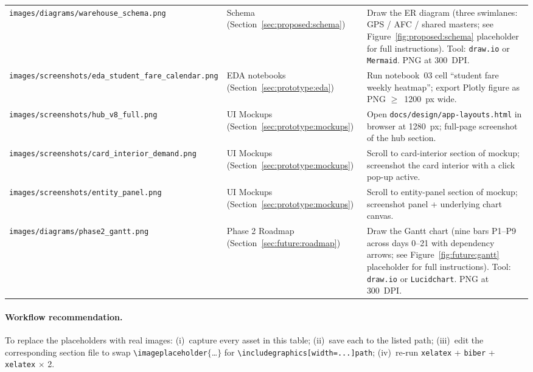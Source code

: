 \begin{longtable}{p{3.4cm}p{4.6cm}p{6.5cm}}
\texttt{images/diagrams/\linebreak warehouse\_schema.png}
& Schema (Section~\ref{sec:proposed:schema})
& Draw the ER diagram (three swimlanes: GPS / AFC / shared
  masters; see Figure~\ref{fig:proposed:schema} placeholder for
  full instructions). Tool: \texttt{draw.io} or
  \texttt{Mermaid}. PNG at 300~DPI. \\

\texttt{images/screenshots/\linebreak eda\_student\_fare\_calendar.png}
& EDA notebooks (Section~\ref{sec:prototype:eda})
& Run notebook~03 cell ``student fare weekly heatmap''; export
  Plotly figure as PNG $\geq$~1200~px wide. \\

\texttt{images/screenshots/\linebreak hub\_v8\_full.png}
& UI Mockups (Section~\ref{sec:prototype:mockups})
& Open \texttt{docs/design/app-layouts.html} in browser at
  1280~px; full-page screenshot of the hub section. \\

\texttt{images/screenshots/\linebreak card\_interior\_demand.png}
& UI Mockups (Section~\ref{sec:prototype:mockups})
& Scroll to card-interior section of mockup; screenshot the
  card interior with a click pop-up active. \\

\texttt{images/screenshots/\linebreak entity\_panel.png}
& UI Mockups (Section~\ref{sec:prototype:mockups})
& Scroll to entity-panel section of mockup; screenshot panel +
  underlying chart canvas. \\

\texttt{images/diagrams/\linebreak phase2\_gantt.png}
& Phase 2 Roadmap (Section~\ref{sec:future:roadmap})
& Draw the Gantt chart (nine bars P1--P9 across days 0--21
  with dependency arrows; see Figure~\ref{fig:future:gantt}
  placeholder for full instructions). Tool: \texttt{draw.io}
  or \texttt{Lucidchart}. PNG at 300~DPI. \\

\hline
\end{longtable}

\paragraph{Workflow recommendation.}
To replace the placeholders with real images: (i)~capture every
asset in this table; (ii)~save each to the listed path;
(iii)~edit the corresponding section file to swap
\texttt{\textbackslash imageplaceholder}$\{$\dots$\}$ for
\texttt{\textbackslash includegraphics[width=...]{path}};
(iv)~re-run \texttt{xelatex} + \texttt{biber} +
\texttt{xelatex} $\times$ 2.

